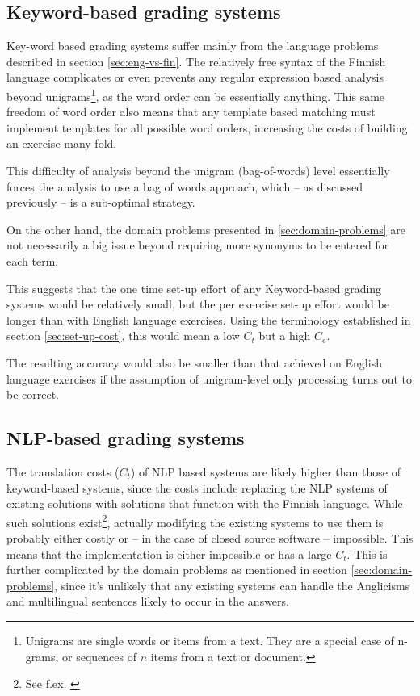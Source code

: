 \documentclass[english]{tktltiki2}
\theoremstyle{definition}
\theoremstyle{remark}
\begin{document}
\subsection{Keyword-based grading systems}

Key-word based grading systems suffer mainly from the language problems described in section \ref{sec:eng-vs-fin}. The relatively free syntax of the Finnish language complicates or even prevents any regular expression based analysis beyond unigrams\footnote{Unigrams are single words or items from a text. They are a special case of n-grams, or sequences of $n$ items from a text or document.}, as the word order can be essentially anything. This same freedom of word order also means that any template based matching must implement templates for all possible word orders, increasing the costs of building an exercise many fold.

This difficulty of analysis beyond the unigram (bag-of-words) level essentially forces the analysis to use a bag of words approach, which -- as discussed previously -- is a sub-optimal strategy.

On the other hand, the domain problems presented in \ref{sec:domain-problems} are not necessarily a big issue beyond requiring more synonyms to be entered for each term.

This suggests that the one time set-up effort of any Keyword-based grading systems would be relatively small, but the per exercise set-up effort would be longer than with English language exercises. Using the terminology established in section \ref{sec:set-up-cost}, this would mean a low $C_t$ but a high $C_e$.

The resulting accuracy would also be smaller than that achieved on English language exercises if the assumption of unigram-level only processing turns out to be correct.

\subsection{NLP-based grading systems}

The translation costs ($C_t$) of NLP based systems are likely higher than those of keyword-based systems, since the costs include replacing the NLP systems of existing solutions with solutions that function with the Finnish language. While such solutions exist\footnote{See f.ex. \cite{linden11, pirinen11, linden13}}, actually modifying the existing systems to use them is probably either costly or -- in the case of closed source software -- impossible. This means that the implementation is either impossible or has a large $C_t$. This is further complicated by the domain problems as mentioned in section \ref{sec:domain-problems}, since it's unlikely that any existing systems can handle the Anglicisms and multilingual sentences likely to occur in the answers.
\end{document}

